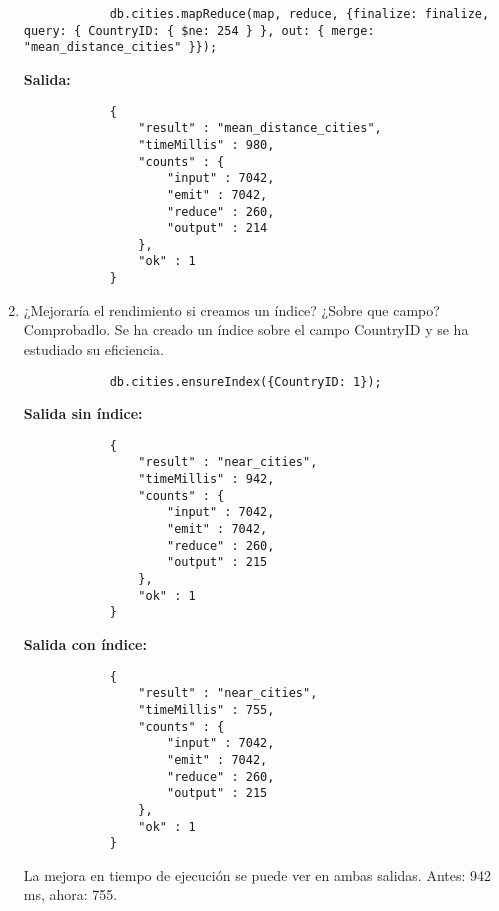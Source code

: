 \begin{enumerate}
\begin{lstlisting}
			db.cities.mapReduce(map, reduce, {finalize: finalize, query: { CountryID: { $ne: 254 } }, out: { merge: "mean_distance_cities" }});
		\end{lstlisting}
		\textbf{Salida:}
		\begin{lstlisting}
			{
				"result" : "mean_distance_cities",
				"timeMillis" : 980,
				"counts" : {
					"input" : 7042,
					"emit" : 7042,
					"reduce" : 260,
					"output" : 214
				},
				"ok" : 1
			}
		\end{lstlisting}
		
	\item ¿Mejoraría el rendimiento si creamos un índice? ¿Sobre que campo? Comprobadlo.
		Se ha creado un índice sobre el campo CountryID y se ha estudiado su eficiencia.
		\begin{lstlisting}
			db.cities.ensureIndex({CountryID: 1});
		\end{lstlisting}
		\textbf{Salida sin índice:}
		\begin{lstlisting}
			{
				"result" : "near_cities",
				"timeMillis" : 942,
				"counts" : {
					"input" : 7042,
					"emit" : 7042,
					"reduce" : 260,
					"output" : 215
				},
				"ok" : 1
			}
		\end{lstlisting}
		\textbf{Salida con índice:}
		\begin{lstlisting}
			{
				"result" : "near_cities",
				"timeMillis" : 755,
				"counts" : {
					"input" : 7042,
					"emit" : 7042,
					"reduce" : 260,
					"output" : 215
				},
				"ok" : 1
			}
		\end{lstlisting}
		La mejora en tiempo de ejecución se puede ver en ambas salidas. Antes: 942 ms, ahora: 755.
\end{enumerate}



